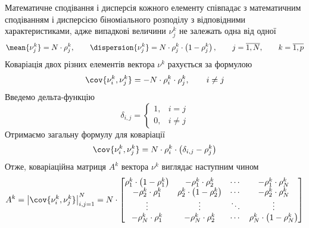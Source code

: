 Математичне сподівання і дисперсія кожного елементу співпадає з математичним
сподіванням і дисперсією біноміального розподілу з відповідними
характеристиками, адже випадкові величини $\nu_j^k$ не залежать одна від одної
\begin{equation*}
  \mean{\nu_j^k} = N \cdot \rho_j^k,\qquad
  \dispersion{\nu_j^k} = N \cdot \rho_j^k \cdot \left( 1 - \rho_j^k \right),
  \qquad j = \overline{1,N},
  \qquad k = \overline{1,p}
\end{equation*}
Коваріація двох різних елементів вектора $\nu^k$ рахується за формулою
\cite{Mukhopadhyay:2000}
\begin{equation*}
  \cov{\nu_i^k, \nu_j^k} = - N \cdot \rho_i^k \cdot \rho_j^k,
  \qquad i \neq j
\end{equation*}
Введемо дельта-функцію
\begin{equation*}
  \delta_{i, j} = \begin{cases}
    1,& i = j \\
    0,& i \neq j
  \end{cases}
\end{equation*}
Отримаємо загальну формулу для коваріації
\begin{equation*}
  \cov{\nu_i^k, \nu_j^k}
  = N \cdot \rho_i^k \cdot \left( \delta_{i, j} - \rho_j^k \right)
\end{equation*}
Отже, коваріаційна матриця $A^k$ вектора $\nu^k$ виглядає наступним чином
\begin{equation*}
  A^k
  = \left| \cov{\nu_i^k, \nu_j^k} \right|_{i,j=1}^N
  = N \cdot
   \begin{bmatrix}
      \rho_1^k \cdot \left( 1 - \rho_1^k \right) & - \rho_1^k \cdot \rho_2^k
              & \cdots & - \rho_1^k \cdot \rho_N^k \\

      - \rho_2^k \cdot \rho_1^k                  & \rho_2^k \cdot
          \left( 1 - \rho_2^k \right) & \cdots & - \rho_2^k \cdot \rho_N^k \\

      \vdots                                     & \vdots
              & \ddots & \vdots \\

       - \rho_N^k \cdot \rho_1^k                 & - \rho_N^k \cdot \rho_2^k
              & \cdots & \rho_N^k \cdot \left( 1 - \rho_N^k \right)
    \end{bmatrix}
\end{equation*}

